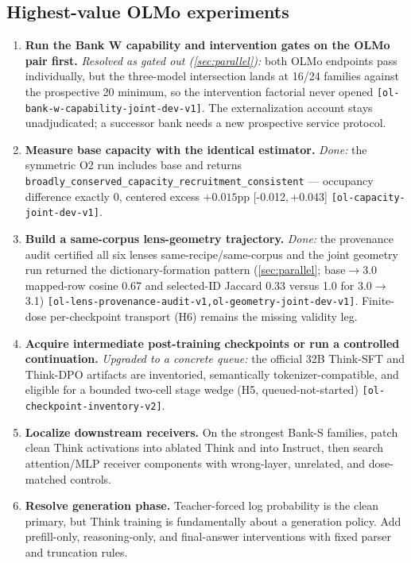 \documentclass[11pt]{article}
\newcommand{\eid}[1]{{\footnotesize\nolinkurl{[#1]}}}
\newcommand{\ci}[2]{{[#1,\,#2]}}
\begin{document}
\subsection{Highest-value OLMo experiments}

\begin{enumerate}
  \item \textbf{Run the Bank W capability and intervention gates on the OLMo
  pair first.} \emph{Resolved as gated out (\cref{sec:parallel}):} both OLMo
  endpoints pass individually, but the three-model intersection lands at
  16/24 families against the prospective 20 minimum, so the intervention
  factorial never opened \eid{ol-bank-w-capability-joint-dev-v1}. The
  externalization account stays unadjudicated; a successor bank needs a new
  prospective service protocol.

  \item \textbf{Measure base capacity with the identical estimator.}
  \emph{Done:} the symmetric O2 run includes base and returns
  \texttt{broadly\_conserved\_capacity\_recruitment\_consistent} ---
  occupancy difference exactly 0, centered excess $+0.015$pp
  \ci{-0.012}{+0.043} \eid{ol-capacity-joint-dev-v1}.

  \item \textbf{Build a same-corpus lens-geometry trajectory.} \emph{Done:}
  the provenance audit certified all six lenses same-recipe/same-corpus and
  the joint geometry run returned the dictionary-formation pattern
  (\cref{sec:parallel}; base$\to$3.0 mapped-row cosine 0.67 and selected-ID
  Jaccard 0.33 versus 1.0 for 3.0$\to$3.1)
  \eid{ol-lens-provenance-audit-v1,ol-geometry-joint-dev-v1}. Finite-dose
  per-checkpoint transport (H6) remains the missing validity leg.

  \item \textbf{Acquire intermediate post-training checkpoints or run a
  controlled continuation.} \emph{Upgraded to a concrete queue:} the official
  32B Think-SFT and Think-DPO artifacts are inventoried, semantically
  tokenizer-compatible, and eligible for a bounded two-cell stage wedge (H5,
  queued-not-started) \eid{ol-checkpoint-inventory-v2}.

  \item \textbf{Localize downstream receivers.} On the strongest Bank-S
  families, patch clean Think activations into ablated Think and into Instruct,
  then search attention/MLP receiver components with wrong-layer, unrelated,
  and dose-matched controls.

  \item \textbf{Resolve generation phase.} Teacher-forced log probability is
  the clean primary, but Think training is fundamentally about a generation
  policy. Add prefill-only, reasoning-only, and final-answer interventions with
  fixed parser and truncation rules.
\end{enumerate}
\end{document}
